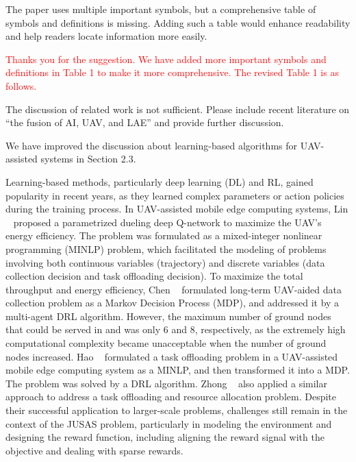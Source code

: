 \begin{revcomment}
	The paper uses multiple important symbols, but a comprehensive table of symbols and definitions is missing. Adding such a table would enhance readability and help readers locate information more easily.
\end{revcomment}
\begin{revresponse}
	\textcolor{red}{
	Thanks you for the suggestion. We have added more important symbols and definitions in Table 1 to make it more comprehensive. The revised Table 1 is as follows.
	}
	\begin{changes}
	\end{changes}
\end{revresponse}

\begin{revcomment}
	The discussion of related work is not sufficient. Please include recent literature on ``the fusion of AI, UAV, and LAE'' and provide further discussion.
\end{revcomment}
\begin{revresponse}
	We have improved the discussion about learning-based algorithms for UAV-assisted systems in Section 2.3.
	\begin{changes}
		Learning-based methods, particularly deep learning (DL) and RL, gained popularity in recent years, as they learned complex parameters or action policies during the training process.
		In UAV-assisted mobile edge computing systems, Lin \etal~\cite{b-DL} proposed a parametrized dueling deep Q-network to maximize the UAV's energy efficiency.
		The problem was formulated as a mixed-integer nonlinear programming (MINLP) problem, which facilitated the modeling of problems involving both continuous variables (\eg trajectory) and discrete variables (\eg data collection decision and task offloading decision).
		To maximize the total throughput and energy efficiency, Chen \etal~\cite{b-RL} formulated long-term UAV-aided data collection problem as a Markov Decision Process (MDP), and addressed it by a multi-agent DRL algorithm.
		However, the maximum number of ground nodes that could be served in \cite{b-DL} and \cite{b-RL} was only 6 and 8, respectively, as the extremely high computational complexity became unacceptable when the number of ground nodes increased.
		Hao \etal~\cite{hao-minlp} formulated a task offloading problem in a UAV-assisted mobile edge computing system as a MINLP, and then transformed it into a MDP.
		The problem was solved by a DRL algorithm.
		Zhong \etal~\cite{zhong-minlp} also applied a similar approach to address a task offloading and resource allocation problem.
		Despite their successful application to larger-scale problems, challenges still remain in the context of the JUSAS problem, particularly in modeling the environment and designing the reward function, including aligning the reward signal with the objective and dealing with sparse rewards.
	\end{changes}
\end{revresponse}

